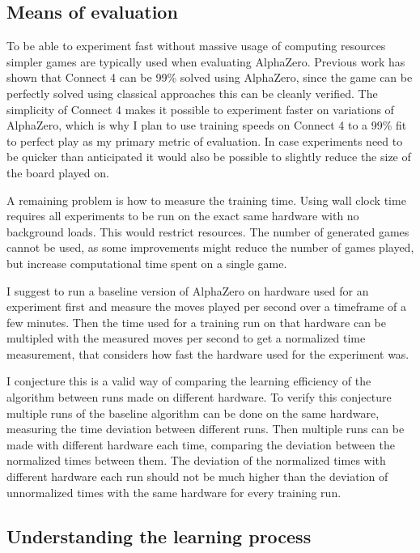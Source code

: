 \documentclass[12pt,onecolumn,oneside,titlepage]{article}
\begin{document}
\subsection{Means of evaluation}

To be able to experiment fast without massive usage of computing resources simpler games are typically used when evaluating AlphaZero.
Previous work \cite{oracledevs} has shown that Connect 4 can be 99\% solved using AlphaZero, since the game can be perfectly solved using classical approaches this can be cleanly verified.
The simplicity of Connect 4 makes it possible to experiment faster on variations of AlphaZero, which is why I plan to use training speeds on Connect 4 to a 99\% fit to perfect play as my primary metric of evaluation. In case
experiments need to be quicker than anticipated it would also be possible to slightly reduce the size of the board played on.

A remaining problem is how to measure the training time. Using wall clock time requires all experiments to be run on the exact same hardware with no background loads. This would restrict resources.
The number of generated games cannot be used, as some improvements might reduce the number of games played, but increase computational time spent on a single game.

I suggest to run a baseline version of AlphaZero on hardware used for an experiment first and measure the moves played per second over a timeframe of a few minutes. Then the time used for a training run on that hardware can be multipled with the 
measured moves per second to get a normalized time measurement, that considers how fast the hardware used for the experiment was.

I conjecture this is a valid way of comparing the learning efficiency of the algorithm between runs made on different hardware.
To verify this conjecture multiple runs of the baseline algorithm can be done on the same hardware, measuring the time deviation between different runs.
Then multiple runs can be made with different hardware each time, comparing the deviation between the normalized times between them.
The deviation of the normalized times with different hardware each run should not be much higher than the deviation of unnormalized times with the same hardware for every training run.


\subsection{Understanding the learning process}
\end{document}
